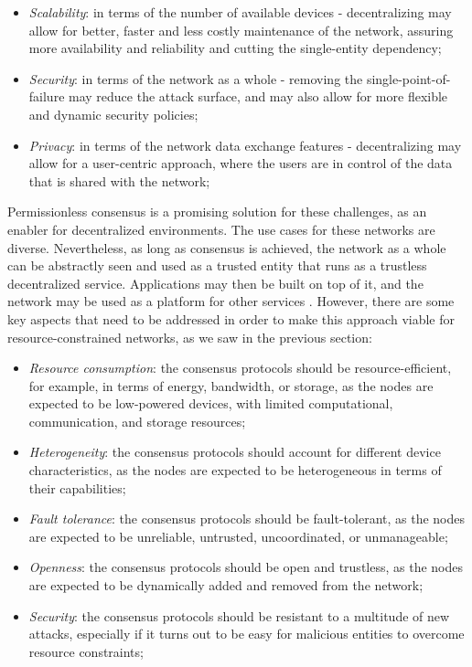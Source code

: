 \documentclass[journal]{IEEEtran}
\begin{document}
\begin{itemize}
  \item \emph{Scalability}:  in terms of the number of available devices - decentralizing may allow
  for better, faster and less costly maintenance of the network, assuring more availability and reliability
  and cutting the single-entity dependency;
  \item \emph{Security}: in terms of the network as a whole - removing the single-point-of-failure 
  may reduce the attack surface, and may also allow for more flexible and dynamic security policies;
  \item \emph{Privacy}: in terms of the network data exchange features - decentralizing may allow for
  a user-centric approach, where the users are in control of the data that is shared with the network; 
\end{itemize}

Permissionless consensus is a promising solution for these challenges, as an enabler for
decentralized environments. The use cases for these networks are diverse. Nevertheless,
as long as consensus is achieved, the network as a whole can be abstractly seen and used
as a trusted entity that runs as a trustless decentralized service. Applications may then
be built on top of it, and the network may be used as a platform for other services \cite{queralta2021blockchain}.
However, there are some key aspects that need to be addressed
in order to make this approach viable for resource-constrained networks, as we saw in the previous section:

\begin{itemize}
  \item \emph{Resource consumption}: the consensus protocols should be resource-efficient, for example, in terms of energy, bandwidth, or storage, 
  as the nodes are expected to be low-powered devices, with limited computational, communication, and storage resources;
  \item \emph{Heterogeneity}: the consensus protocols should account for different device characteristics, 
  as the nodes are expected to be heterogeneous in terms of their capabilities;
  \item \emph{Fault tolerance}: the consensus protocols should be fault-tolerant, as the nodes are expected to be unreliable, 
  untrusted, uncoordinated, or unmanageable;
  \item \emph{Openness}: the consensus protocols should be open and trustless, as the nodes are expected to be 
  dynamically added and removed from the network;
  \item \emph{Security}: the consensus protocols should be resistant to a multitude of new attacks,
   especially if it turns out to be easy for malicious entities to overcome resource constraints;
\end{itemize}
\end{document}
